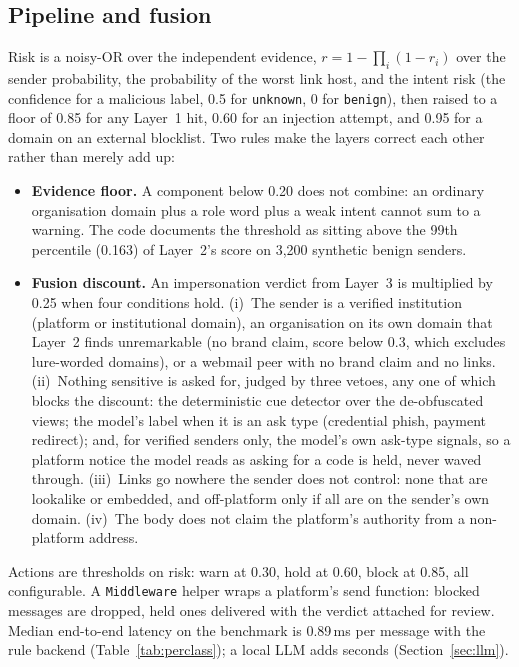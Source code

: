 \documentclass[10pt,twocolumn]{article}
\newcommand{\code}[1]{\texttt{#1}}
\begin{document}
\subsection{Pipeline and fusion}
\label{sec:pipeline}

Risk is a noisy-OR over the independent evidence, $r = 1-\prod_i(1-r_i)$ over the sender probability, the probability of the worst link host, and the intent risk (the confidence for a malicious label, 0.5 for \code{unknown}, 0 for \code{benign}), then raised to a floor of 0.85 for any Layer~1 hit, 0.60 for an injection attempt, and 0.95 for a domain on an external blocklist. Two rules make the layers correct each other rather than merely add up:
\begin{itemize}
\item \textbf{Evidence floor.} A component below 0.20 does not combine: an ordinary organisation domain plus a role word plus a weak intent cannot sum to a warning. The code documents the threshold as sitting above the 99th percentile (0.163) of Layer~2's score on 3{,}200 synthetic benign senders.
\item \textbf{Fusion discount.} An impersonation verdict from Layer~3 is multiplied by 0.25 when four conditions hold. (i)~The sender is a verified institution (platform or institutional domain), an organisation on its own domain that Layer~2 finds unremarkable (no brand claim, score below 0.3, which excludes lure-worded domains), or a webmail peer with no brand claim and no links. (ii)~Nothing sensitive is asked for, judged by three vetoes, any one of which blocks the discount: the deterministic cue detector over the de-obfuscated views; the model's label when it is an ask type (credential phish, payment redirect); and, for verified senders only, the model's own ask-type signals, so a platform notice the model reads as asking for a code is held, never waved through. (iii)~Links go nowhere the sender does not control: none that are lookalike or embedded, and off-platform only if all are on the sender's own domain. (iv)~The body does not claim the platform's authority from a non-platform address.
\end{itemize}
Actions are thresholds on risk: warn at 0.30, hold at 0.60, block at 0.85, all configurable. A \code{Middleware} helper wraps a platform's send function: blocked messages are dropped, held ones delivered with the verdict attached for review. Median end-to-end latency on the benchmark is 0.89\,ms per message with the rule backend (Table~\ref{tab:perclass}); a local LLM adds seconds (Section~\ref{sec:llm}).
\end{document}

